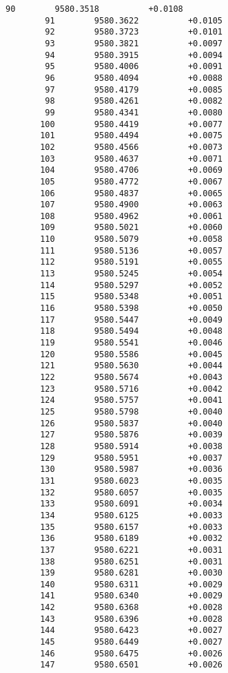 \documentclass[11pt]{article}
\begin{document}
\begin{Verbatim}[commandchars=\\\{\}]
        90        9580.3518          +0.0108
        91        9580.3622          +0.0105
        92        9580.3723          +0.0101
        93        9580.3821          +0.0097
        94        9580.3915          +0.0094
        95        9580.4006          +0.0091
        96        9580.4094          +0.0088
        97        9580.4179          +0.0085
        98        9580.4261          +0.0082
        99        9580.4341          +0.0080
       100        9580.4419          +0.0077
       101        9580.4494          +0.0075
       102        9580.4566          +0.0073
       103        9580.4637          +0.0071
       104        9580.4706          +0.0069
       105        9580.4772          +0.0067
       106        9580.4837          +0.0065
       107        9580.4900          +0.0063
       108        9580.4962          +0.0061
       109        9580.5021          +0.0060
       110        9580.5079          +0.0058
       111        9580.5136          +0.0057
       112        9580.5191          +0.0055
       113        9580.5245          +0.0054
       114        9580.5297          +0.0052
       115        9580.5348          +0.0051
       116        9580.5398          +0.0050
       117        9580.5447          +0.0049
       118        9580.5494          +0.0048
       119        9580.5541          +0.0046
       120        9580.5586          +0.0045
       121        9580.5630          +0.0044
       122        9580.5674          +0.0043
       123        9580.5716          +0.0042
       124        9580.5757          +0.0041
       125        9580.5798          +0.0040
       126        9580.5837          +0.0040
       127        9580.5876          +0.0039
       128        9580.5914          +0.0038
       129        9580.5951          +0.0037
       130        9580.5987          +0.0036
       131        9580.6023          +0.0035
       132        9580.6057          +0.0035
       133        9580.6091          +0.0034
       134        9580.6125          +0.0033
       135        9580.6157          +0.0033
       136        9580.6189          +0.0032
       137        9580.6221          +0.0031
       138        9580.6251          +0.0031
       139        9580.6281          +0.0030
       140        9580.6311          +0.0029
       141        9580.6340          +0.0029
       142        9580.6368          +0.0028
       143        9580.6396          +0.0028
       144        9580.6423          +0.0027
       145        9580.6449          +0.0027
       146        9580.6475          +0.0026
       147        9580.6501          +0.0026

\end{Verbatim}
\end{document}
